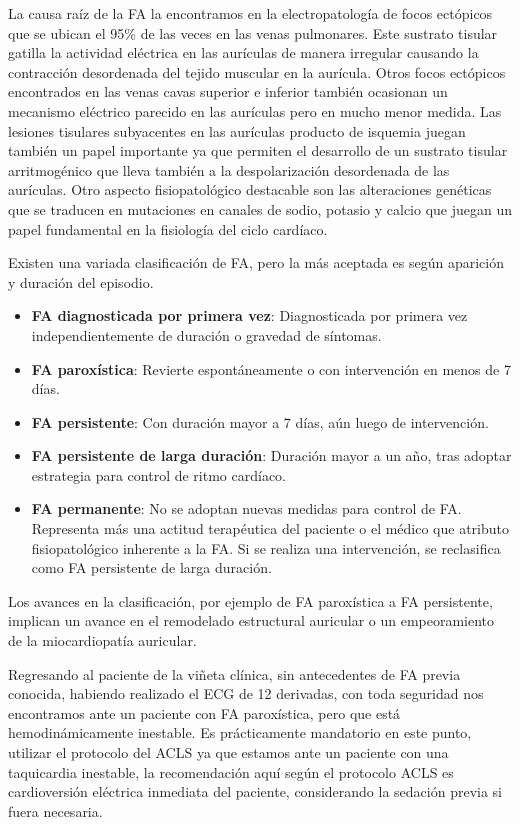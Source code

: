 \documentclass[a4paper]{article}
\let\cite=\supercite
\begin{document}
\begin{multicols}{3}
La causa raíz de la FA la encontramos en la electropatología de focos ectópicos
que se ubican el 95\% de las veces en las venas pulmonares. Este sustrato
tisular gatilla la actividad eléctrica en las aurículas de manera irregular
causando la contracción desordenada del tejido muscular en la aurícula. Otros
focos ectópicos encontrados en las venas cavas superior e inferior también
ocasionan un mecanismo eléctrico parecido en las aurículas pero en mucho menor
medida. Las lesiones tisulares subyacentes en las aurículas producto de
isquemia juegan también un papel importante ya que permiten el desarrollo de un
sustrato tisular arritmogénico que lleva también a la despolarización
desordenada de las aurículas. Otro aspecto fisiopatológico destacable son las
alteraciones genéticas que se traducen en mutaciones en canales de sodio,
potasio y calcio que juegan un papel fundamental en la fisiología del ciclo
cardíaco\cite{brundel_atrial_2022}.

Existen una variada clasificación de FA, pero la más aceptada es según
aparición y duración del episodio.

\begin{itemize}
    \item \footnotesize{\textbf{FA diagnosticada por primera vez}: Diagnosticada por primera vez independientemente de duración o gravedad de síntomas.}
    \item \textbf{FA paroxística}: Revierte espontáneamente o con intervención en menos de 7 días.
    \item \textbf{FA persistente}: Con duración mayor a 7 días, aún luego de intervención.
		\item \textbf{FA persistente de larga duración}: Duración mayor a un año, tras adoptar estrategia para control de ritmo cardíaco.
		\item \textbf{FA permanente}: No se adoptan nuevas medidas para control de FA. Representa más una actitud terapéutica del paciente o el médico que atributo fisiopatológico inherente a la FA. Si se realiza una intervención, se reclasifica como FA persistente de larga duración.
\end{itemize}

Los avances en la clasificación, por ejemplo de FA paroxística a FA persistente,
implican un avance en el remodelado estructural auricular o un empeoramiento
de la miocardiopatía auricular.

Regresando al paciente de la viñeta clínica, sin antecedentes de FA previa
conocida, habiendo realizado el ECG de 12 derivadas, con toda seguridad nos
encontramos ante un paciente con FA paroxística, pero que está
hemodinámicamente inestable. Es prácticamente mandatorio en este punto,
utilizar el protocolo del ACLS ya que estamos ante un paciente con una
taquicardia inestable, la recomendación aquí según el protocolo ACLS es
cardioversión eléctrica inmediata del paciente, considerando la
sedación previa si fuera necesaria\cite{aha2020}.


\end{multicols}
\end{document}
